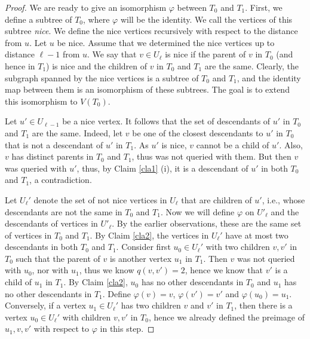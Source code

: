 \documentclass[12pt,a4paper]{amsart}
\theoremstyle{plain}
\theoremstyle{definition}
\begin{document}
\begin{proof}
We are ready to give an isomorphism $\varphi$ between $T_0$ and $T_1$. First, we define a subtree of $T_0$, where $\varphi$ will be the identity. We call the vertices of this subtree \emph{nice}. We define the nice vertices recursively with respect to the distance from $u$. Let $u$ be nice. Assume that we determined the nice vertices up to distance $\ell-1$ from $u$. We say that $v \in U_\ell$ is nice if the parent of $v$ in $T_0$ (and hence in $T_1$) is nice and the children of $v$ in $T_0$ and $T_1$ are the same. Clearly, the subgraph spanned by the nice vertices is a subtree of $T_0$ and $T_1$, and the identity map between them is an isomorphism of these subtrees. 
The goal is to extend this isomorphism to $V(T_0)$. 

Let $u'\in U_{\ell-1}$ be a nice vertex. It follows that the set of descendants of $u'$ in $T_0$ and $T_1$ are the same. Indeed, let $v$ be one of the closest descendants to $u'$ in $T_0$ that is not a descendant of $u'$ in $T_1$. As $u'$ is nice, $v$ cannot be a child of $u'$. Also, $v$ has distinct parents in $T_0$ and $T_1$, thus was not queried with them. But then $v$ was queried with $u'$, thus, by Claim \ref{cla1} (i), it is a descendant of $u'$ in both $T_0$ and $T_1$, a contradiction. 

Let $U_{\ell}'$ denote the set of not nice vertices in $U_\ell$ that are children of $u'$, i.e., whose descendants are not the same in $T_0$ and $T_1$. Now we will define $\varphi$ on $U'_\ell$ and the descendants of vertices in $U'_\ell$. By the earlier observations, these are the same set of vertices in $T_0$ and $T_1$. By Claim \ref{cla2}, the vertices in $U_{\ell}'$ have at most two descendants in both $T_0$ and $T_1$.
Consider first $u_0\in U_\ell'$ with two children $v,v'$ in $T_0$ such that the parent of $v$ is another vertex $u_1$ in $T_1$. Then $v$ was not queried with $u_0$, nor with $u_1$, thus we know $q(v,v')=2$, hence we know that $v'$ is a child of $u_1$ in $T_1$. By Claim \ref{cla2}, $u_0$ has no other descendants in $T_0$ and $u_1$ has no other descendants in $T_1$. Define $\varphi(v)=v$, $\varphi(v')=v'$ and $\varphi(u_0)=u_1$.
Conversely, if a vertex $u_1 \in U_{\ell}'$ has two children $v$ and $v'$ in $T_1$, then there is a vertex $u_0 \in U_{\ell}'$ with children $v, v'$ in $T_0$, hence we already defined the preimage of $u_1, v, v'$ with respect to $\varphi$ in this step.


\end{proof}
\end{document}
